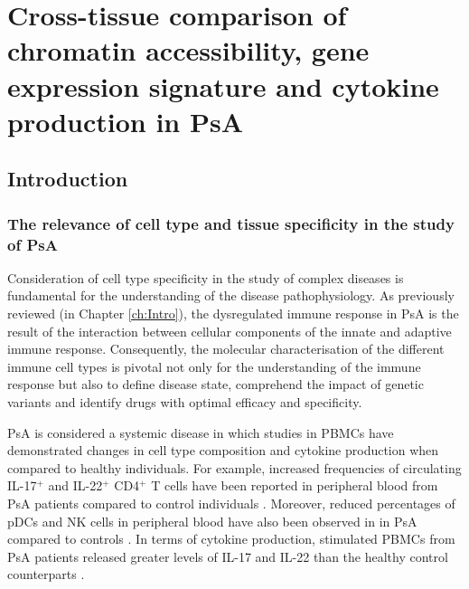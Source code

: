 \chapter{Cross-tissue comparison of chromatin accessibility, gene expression signature and cytokine production in PsA}
\label{ch:Results3}



\section{Introduction}

\subsection{The relevance of cell type and tissue specificity in the study of PsA}

Consideration of cell type specificity in the study of complex diseases is fundamental for the understanding of the disease pathophysiology. As previously reviewed (in Chapter \ref{ch:Intro}), the dysregulated immune response in PsA is the result of the interaction between cellular components of the innate and adaptive immune response. Consequently, the molecular characterisation of the different immune cell types is pivotal not only for the understanding of the immune response but also to define disease state, comprehend the impact of genetic variants and identify drugs with optimal efficacy and specificity.

PsA is considered a systemic disease in which studies in PBMCs have demonstrated changes in cell type composition and cytokine production when compared to healthy individuals. For example, increased frequencies of circulating IL-17$^+$ and IL-22$^+$ CD4$^+$ T cells have been reported in peripheral blood from PsA patients compared to control individuals \parencite{Benham2013}. Moreover, reduced percentages of pDCs and NK cells in peripheral blood have also been observed in in PsA compared to controls \parencite{Jongbloed2006, Spadaro2004}. In terms of cytokine production, stimulated PBMCs from PsA patients released greater levels of IL-17 and IL-22 than the healthy control counterparts \parencite{Benham2013}. 

